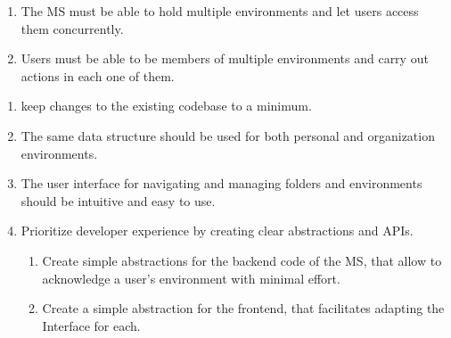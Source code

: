 \begin{enumerate}
\begin{enumerate}
    \end{enumerate}

  \item The MS must be able to hold multiple environments and let users access them concurrently.

  \item Users must be able to be members of multiple environments and carry out actions in each one of them.


\end{enumerate}

\begin{enumerate}
  \item keep changes to the existing codebase to a minimum.

  \item The same data structure should be used for both personal and organization environments.


  \item The user interface for navigating and managing folders and environments should
    be intuitive and easy to use.

  \item Prioritize developer experience by creating clear abstractions and APIs.
    \begin{enumerate}
      \item Create simple abstractions for the backend code of the MS, that allow to acknowledge a user's environment with minimal effort.
      \item Create a simple abstraction for the frontend, that facilitates adapting
        the Interface for each.
    \end{enumerate}

\end{enumerate}



